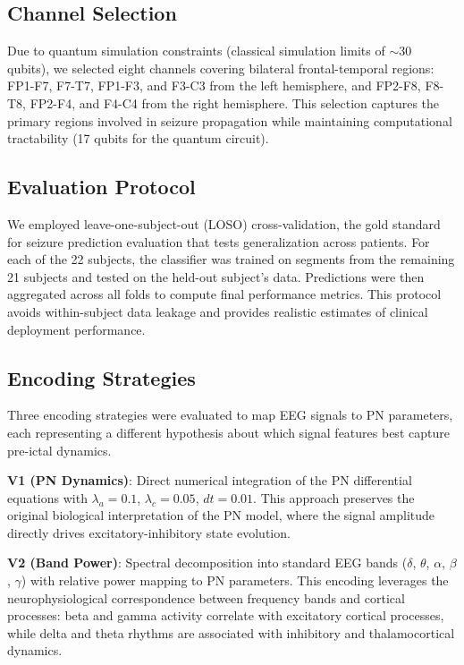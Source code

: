 \documentclass[11pt,a4paper]{article}
\begin{document}
\subsection{Channel Selection}

Due to quantum simulation constraints (classical simulation limits of $\sim$30 qubits), we selected eight channels covering bilateral frontal-temporal regions: FP1-F7, F7-T7, FP1-F3, and F3-C3 from the left hemisphere, and FP2-F8, F8-T8, FP2-F4, and F4-C4 from the right hemisphere. This selection captures the primary regions involved in seizure propagation while maintaining computational tractability (17 qubits for the quantum circuit).

\subsection{Evaluation Protocol}

We employed leave-one-subject-out (LOSO) cross-validation, the gold standard for seizure prediction evaluation that tests generalization across patients. For each of the 22 subjects, the classifier was trained on segments from the remaining 21 subjects and tested on the held-out subject's data. Predictions were then aggregated across all folds to compute final performance metrics. This protocol avoids within-subject data leakage and provides realistic estimates of clinical deployment performance.

\subsection{Encoding Strategies}

Three encoding strategies were evaluated to map EEG signals to PN parameters, each representing a different hypothesis about which signal features best capture pre-ictal dynamics.

\textbf{V1 (PN Dynamics)}: Direct numerical integration of the PN differential equations with $\lambda_a = 0.1$, $\lambda_c = 0.05$, $dt = 0.01$. This approach preserves the original biological interpretation of the PN model, where the signal amplitude directly drives excitatory-inhibitory state evolution.

\textbf{V2 (Band Power)}: Spectral decomposition into standard EEG bands ($\delta$, $\theta$, $\alpha$, $\beta$, $\gamma$) with relative power mapping to PN parameters. This encoding leverages the neurophysiological correspondence between frequency bands and cortical processes: beta and gamma activity correlate with excitatory cortical processes, while delta and theta rhythms are associated with inhibitory and thalamocortical dynamics.
\end{document}
